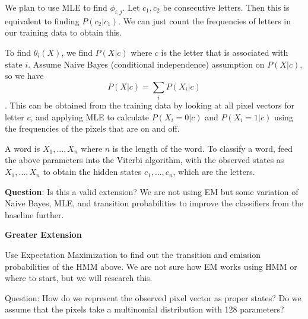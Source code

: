 \documentclass[11pt]{article}
\begin{document}
We plan to use MLE to find $\phi_{i,j}$. Let $c_1, c_2$ be consecutive letters. Then this is equivalent to finding $P(c_2 | c_1)$. We can just count the frequencies of letters in our training data to obtain this.

To find $\theta_{i}(X)$, we find $P(X | c)$ where $c$ is the letter that is associated with state $i$. Assume Naive Bayes (conditional independence) assumption on $P(X | c)$, so we have $$ P(X | c) = \sum_i P(X_i | c)$$. This can be obtained from the training data by looking at all pixel vectors for letter $c$, and applying MLE to calculate $P(X_i = 0 | c)$ and $P(X_i = 1 | c)$ using the frequencies of the pixels that are on and off.

A word is $X_1, ..., X_n$ where $n$ is the length of the word. To classify a word, feed the above parameters into the Viterbi algorithm, with the observed states as $X_1, ..., X_n$ to obtain the hidden states $c_1, ..., c_n$, which are the letters.

\textbf{Question}: Is this a valid extension? We are not using EM but some variation of Naive Bayes, MLE, and transition probabilities to improve the classifiers from the baseline further.

\textbf{Greater Extension}

Use Expectation Maximization to find out the transition and emission probabilities of the HMM above. We are not sure how EM works using HMM or where to start, but we will research this.

Question: How do we represent the observed pixel vector as proper states? Do we assume that the pixels take a multinomial distribution with 128 parameters?

\end{document}
